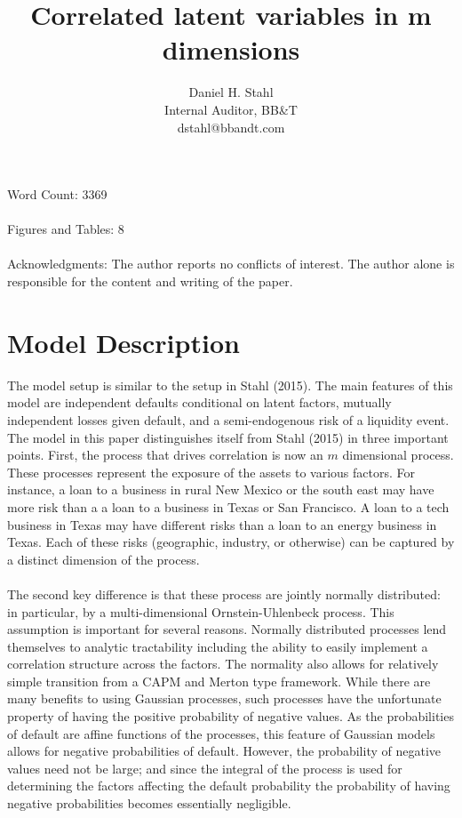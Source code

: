 \documentclass[12pt]{article}
\theoremstyle{definition}
\begin{document}
\title{Correlated latent variables in m dimensions}
\date{}
\author{Daniel H. Stahl\\Internal Auditor, BB\&T
        \\dstahl@bbandt.com}

\maketitle
Word Count: 3369
\\
\\
Figures and Tables: 8
\\
\\
Acknowledgments: The author reports no conflicts of interest.  The author alone is responsible for the content and writing of the paper.
\newpage
 
\section{Model Description}
The model setup is similar to the setup in Stahl (2015).  The main features of this model are independent defaults conditional on latent factors, mutually independent losses given default, and a semi-endogenous risk of a liquidity event.  The model in this paper distinguishes itself from Stahl (2015) in three important points.  First, the process that drives correlation is now an \(m\) dimensional process.  These processes represent the exposure of the assets to various factors.  For instance, a loan to a business in rural New Mexico or the south east may have more risk than a a loan to a business in Texas or San Francisco.  A loan to a tech business in Texas may have different risks than a loan to an energy business in Texas.  Each of these risks (geographic, industry, or otherwise) can be captured by a distinct dimension of the process.  
\\
\\
The second key difference is that these process are jointly normally distributed: in particular, by a multi-dimensional Ornstein-Uhlenbeck process.  This assumption is important for several reasons.  Normally distributed processes lend themselves to analytic tractability including the ability to easily implement a correlation structure across the factors.  The normality also allows for relatively simple transition from a CAPM and Merton type framework.  While there are many benefits to using Gaussian processes, such processes have the unfortunate property of having the positive probability of negative values.  As the probabilities of default are affine functions of the processes, this feature of Gaussian models allows for negative probabilities of default.  However, the probability of negative values need not be large; and since the integral of the process is used for determining the factors affecting the default probability the probability of having negative probabilities becomes essentially negligible.  
\end{document}
